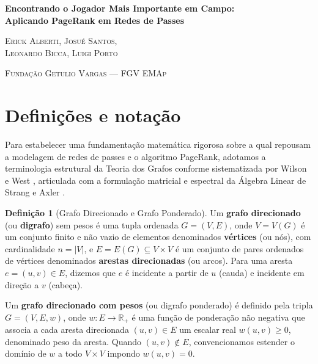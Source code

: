 \documentclass[10pt,a4paper]{article}
\theoremstyle{definition}
\newtheorem{definicao}{Definição}[section]
\theoremstyle{plain}
\theoremstyle{remark}
\begin{document}
\thispagestyle{plain}
\vspace*{3.2cm}
\begin{center}
    {\LARGE\sffamily\bfseries Encontrando o Jogador Mais Importante em Campo:\\[0.25cm]
   Aplicando PageRank em Redes de Passes\par}
    \vspace{1.2cm}
    {\large\scshape Erick Alberti, Josué Santos,\\[0.15cm]
    Leonardo Bicca, Luigi Porto\par}
    \vspace{0.4cm}
    {\normalsize\scshape Fundação Getulio Vargas --- FGV EMAp\par}
\end{center}
\vfill
\newpage
\renewcommand{\contentsname}{\sffamily\bfseries Conteúdo}
\tableofcontents
\newpage
\setcounter{section}{-1}
\section{\sffamily Definições e notação}

Para estabelecer uma fundamentação matemática rigorosa sobre a qual repousam a modelagem de redes de passes e o algoritmo PageRank, adotamos a terminologia estrutural da Teoria dos Grafos conforme sistematizada por Wilson \cite{wilson1996} e West \cite{west2001}, articulada com a formulação matricial e espectral da Álgebra Linear de Strang \cite{strang2016} e Axler \cite{axler2015}.

\begin{definicao}[Grafo Direcionado e Grafo Ponderado]
Um \textbf{grafo direcionado} (ou \textbf{digrafo}) sem pesos é uma tupla ordenada $G = (V, E)$, onde $V = V(G)$ é um conjunto finito e não vazio de elementos denominados \textbf{vértices} (ou nós), com cardinalidade $n = |V|$, e $E = E(G) \subseteq V \times V$ é um conjunto de pares ordenados de vértices denominados \textbf{arestas direcionadas} (ou arcos). Para uma aresta $e = (u, v) \in E$, dizemos que $e$ é incidente a partir de $u$ (cauda) e incidente em direção a $v$ (cabeça).

Um \textbf{grafo direcionado com pesos} (ou digrafo ponderado) é definido pela tripla $G = (V, E, w)$, onde $w : E \to \mathbb{R}_{+}$ é uma função de ponderação não negativa que associa a cada aresta direcionada $(u, v) \in E$ um escalar real $w(u, v) \ge 0$, denominado peso da aresta. Quando $(u, v) \notin E$, convencionamos estender o domínio de $w$ a todo $V \times V$ impondo $w(u, v) = 0$.
\end{definicao}
\end{document}

